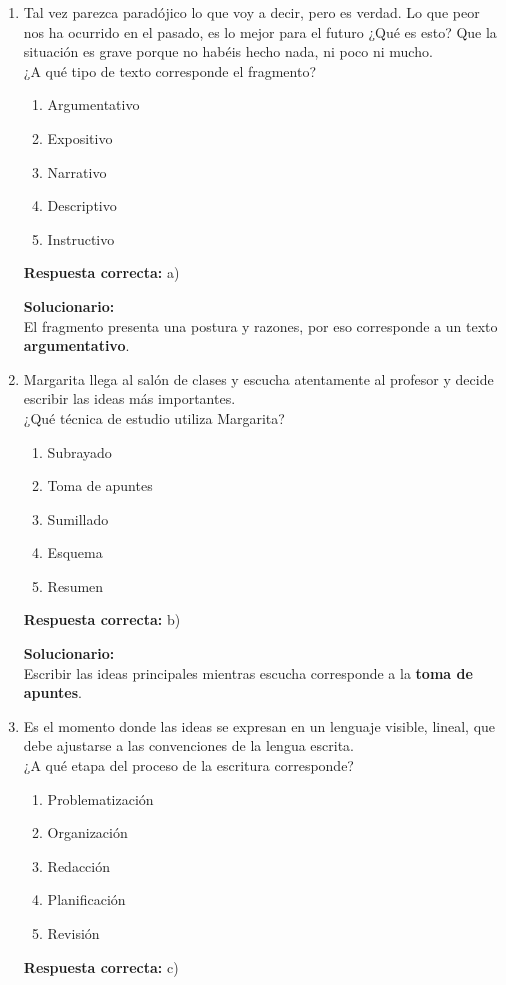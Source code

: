 \begin{enumerate}

	
	\item Tal vez parezca paradójico lo que voy a decir, pero es verdad. Lo que peor nos ha ocurrido en el pasado, es lo mejor para el futuro ¿Qué es esto? Que la situación es grave porque no habéis hecho nada, ni poco ni mucho.\\
	¿A qué tipo de texto corresponde el fragmento?
	\begin{enumerate}[label=\alph*)]
		\item Argumentativo
		\item Expositivo
		\item Narrativo
		\item Descriptivo
		\item Instructivo
	\end{enumerate}
	\textbf{Respuesta correcta:} a)
	
	\vspace{2mm}
	\textbf{Solucionario:}\\
	El fragmento presenta una postura y razones, por eso corresponde a un texto \textbf{argumentativo}.
	
	\vspace{6mm}
	
	\item Margarita llega al salón de clases y escucha atentamente al profesor y decide escribir las ideas más importantes.\\
	¿Qué técnica de estudio utiliza Margarita?
	\begin{enumerate}[label=\alph*)]
		\item Subrayado
		\item Toma de apuntes
		\item Sumillado
		\item Esquema
		\item Resumen
	\end{enumerate}
	\textbf{Respuesta correcta:} b)
	
	\vspace{2mm}
	\textbf{Solucionario:}\\
	Escribir las ideas principales mientras escucha corresponde a la \textbf{toma de apuntes}.
	
	\vspace{6mm}
	
	\item Es el momento donde las ideas se expresan en un lenguaje visible, lineal, que debe ajustarse a las convenciones de la lengua escrita.\\
	¿A qué etapa del proceso de la escritura corresponde?
	\begin{enumerate}[label=\alph*)]
		\item Problematización
		\item Organización
		\item Redacción
		\item Planificación
		\item Revisión
	\end{enumerate}
	\textbf{Respuesta correcta:} c)
	

\end{enumerate}
